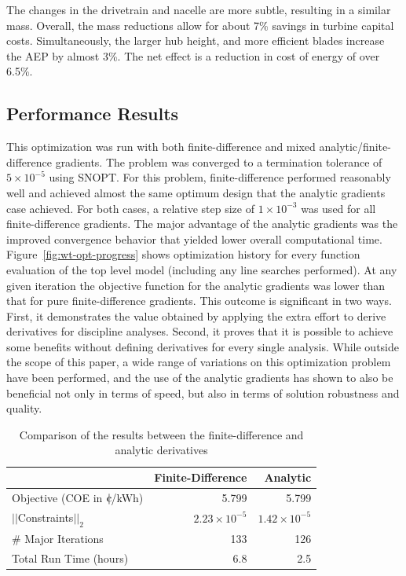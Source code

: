 \documentclass[]{aiaa-tc} %
\newcommand{\cent}{{\mathrm{c}\mkern-6.5mu{\mid}}}
\begin{document}
      The changes in the drivetrain and nacelle are more subtle, resulting in a similar mass.  Overall, the mass reductions allow for about 7\% savings in turbine capital costs.  Simultaneously, the larger hub height, and more efficient blades increase the AEP by almost 3\%.  The net effect is a reduction in cost of energy of over 6.5\%.

    \subsection{Performance Results}
        This optimization was run with both finite-difference and mixed analytic/finite-difference gradients.  The problem was converged to a termination tolerance of $5\times10^{-5}$ using SNOPT.  For this problem, finite-difference performed reasonably well and achieved almost the same optimum design that the analytic gradients case achieved. For both cases, a relative step size of $1\times10^{-3}$ was used for all
        finite-difference gradients. The major advantage of the analytic gradients was the improved convergence
        behavior that yielded lower overall computational time.  Figure~\ref{fig:wt-opt-progress} shows optimization
        history for every function evaluation of the top level model (including any line searches performed). At any given iteration the objective function for the analytic gradients was lower than that for pure finite-difference gradients. This outcome is significant in two ways. First, it demonstrates the value obtained by applying the extra effort to derive derivatives for discipline analyses. Second, it proves that it is possible to achieve some benefits without defining derivatives for every single analysis. While outside the scope of this paper, a wide range of variations on this optimization problem have been performed, and the use of the analytic gradients has shown to also be beneficial not only in terms of speed, but also in terms of solution robustness and quality.



        \begin{table}
            \centering
            \caption{Comparison of the results between the finite-difference and analytic derivatives}
            \begin{tabular}{lrr}
                \toprule
                                                      & Finite-Difference & Analytic \\
                \midrule
                Objective (COE  in $\cent$/kWh)       & 5.799  & 5.799 \\
                $||$Constraints$||_2$                 & $2.23\times10^{-5}$ & $1.42\times10^{-5}$  \\
                \# Major Iterations                   &  133 & 126  \\
                Total Run Time (hours)                &  6.8 & 2.5 \\
                \bottomrule
            \end{tabular}
            \label{tab:wt-fd-speeds}
        \end{table}
\end{document}
